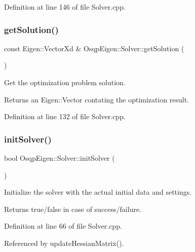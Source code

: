 Definition at line 146 of file Solver.\+cpp.

\mbox{\label{classOsqpEigen_1_1Solver_a192a5f94034d4e467c6b557c2e06dd66}} 
\subsubsection{\texorpdfstring{get\+Solution()}{getSolution()}}
{\footnotesize\ttfamily const Eigen\+::\+Vector\+Xd \& Osqp\+Eigen\+::\+Solver\+::get\+Solution (\begin{DoxyParamCaption}{ }\end{DoxyParamCaption})}



Get the optimization problem solution. 

\begin{DoxyReturn}{Returns}
an Eigen\+::\+Vector contating the optimization result. 
\end{DoxyReturn}


Definition at line 132 of file Solver.\+cpp.

\mbox{\label{classOsqpEigen_1_1Solver_a8487090a685d7653ea4011971c2f21f7}} 
\subsubsection{\texorpdfstring{init\+Solver()}{initSolver()}}
{\footnotesize\ttfamily bool Osqp\+Eigen\+::\+Solver\+::init\+Solver (\begin{DoxyParamCaption}{ }\end{DoxyParamCaption})}



Initialize the solver with the actual initial data and settings. 

\begin{DoxyReturn}{Returns}
true/false in case of success/failure. 
\end{DoxyReturn}


Definition at line 66 of file Solver.\+cpp.



Referenced by update\+Hessian\+Matrix().

\mbox{\label{classOsqpEigen_1_1Solver_a05c8a18a9d9ed9a74fc0dc26af711348}} 
